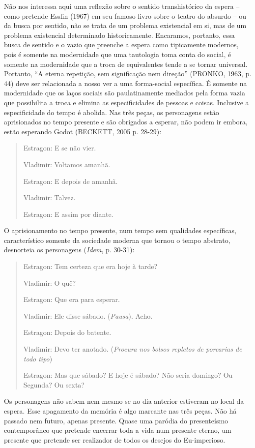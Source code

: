 Não nos interessa aqui uma reflexão sobre o sentido transhistórico da
espera -- como pretende Esslin (1967) em seu famoso livro sobre o teatro
do absurdo -- ou da busca por sentido, não se trata de um problema
existencial em si, mas de um problema existencial determinado
historicamente. Encaramos, portanto, essa busca de sentido e o vazio que
preenche a espera como tipicamente modernos, pois é somente na
modernidade que uma tautologia toma conta do social, é somente na
modernidade que a troca de equivalentes tende a se tornar universal.
Portanto, ``A eterna repetição, sem significação nem direção'' (PRONKO,
1963, p. 44) deve ser relacionada a nosso ver a uma forma-social
específica. É somente na modernidade que os laços sociais são
paulatinamente mediados pela forma vazia que possibilita a troca e
elimina as especificidades de pessoas e coisas. Inclusive a
especificidade do tempo é abolida. Nas três peças, os personagens estão
aprisionados no tempo presente e são obrigados a esperar, não podem ir
embora, estão esperando Godot (BECKETT, 2005 p. 28-29):

\begin{quote}
Estragon: E se não vier.

Vladimir: Voltamos amanhã.

Estragon: E depois de amanhã.

Vladimir: Talvez.

Estragon: E assim por diante.
\end{quote}

O aprisionamento no tempo presente, num tempo sem qualidades
específicas, característico somente da sociedade moderna que tornou o
tempo abstrato, desnorteia os personagens (\emph{Idem}, p. 30-31):

\begin{quote}
Estragon: Tem certeza que era hoje à tarde?

Vladimir: O quê?

Estragon: Que era para esperar.

Vladimir: Ele disse sábado. (\emph{Pausa}). Acho.

Estragon: Depois do batente.

Vladimir: Devo ter anotado. (\emph{Procura nos bolsos repletos de
porcarias de todo tipo})

Estragon: Mas que sábado? E hoje é sábado? Não seria domingo? Ou
Segunda? Ou sexta?
\end{quote}

Os personagens não sabem nem mesmo se no dia anterior estiveram no local
da espera. Esse apagamento da memória é algo marcante nas três peças.
Não há passado nem futuro, apenas presente. Quase uma paródia do
presenteísmo contemporâneo que pretende encerrar toda a vida num
presente eterno, um presente que pretende ser realizador de todos os
desejos do Eu-imperioso.

